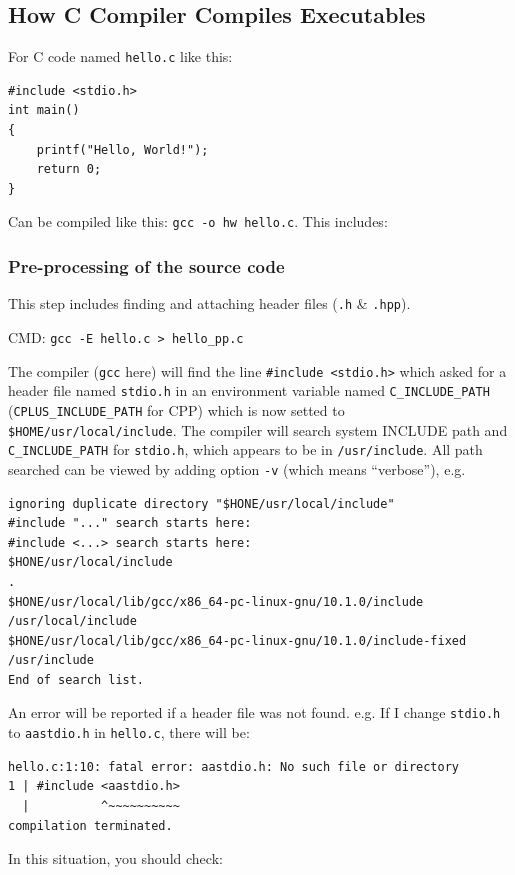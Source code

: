 \documentclass[]{article}
\begin{document}
\subsection{How C Compiler Compiles Executables}
For C code named \verb|hello.c| like this:
\begin{verbatim}
#include <stdio.h>
int main()
{
    printf("Hello, World!");
    return 0;
}
\end{verbatim}

Can be compiled like this: \verb|gcc -o hw hello.c|. This includes:

\subsubsection{Pre-processing of the source code}

This step includes finding and attaching header files (\verb|.h| \& \verb|.hpp|).

CMD: \verb|gcc -E hello.c > hello_pp.c|

The compiler (\verb|gcc| here) will find the line \verb|#include <stdio.h>| which asked for a header file named \verb|stdio.h| in an environment variable named \verb|C_INCLUDE_PATH| (\verb|CPLUS_INCLUDE_PATH| for CPP) which is now setted to \verb|$HOME/usr/local/include|. The compiler will search system INCLUDE path and \verb|C_INCLUDE_PATH| for \verb|stdio.h|, which appears to be in \verb|/usr/include|. All path searched can be viewed by adding option \verb|-v| (which means ``verbose''), e.g.
\begin{verbatim}
ignoring duplicate directory "$HONE/usr/local/include"
#include "..." search starts here:
#include <...> search starts here:
$HONE/usr/local/include
.
$HONE/usr/local/lib/gcc/x86_64-pc-linux-gnu/10.1.0/include
/usr/local/include
$HONE/usr/local/lib/gcc/x86_64-pc-linux-gnu/10.1.0/include-fixed
/usr/include
End of search list.
\end{verbatim}

An error will be reported if a header file was not found. e.g. If I change \verb|stdio.h| to \verb|aastdio.h| in \verb|hello.c|, there will be:

\begin{verbatim}
hello.c:1:10: fatal error: aastdio.h: No such file or directory
1 | #include <aastdio.h>
  |          ^~~~~~~~~~~
compilation terminated.
\end{verbatim}

In this situation, you should check:
\end{document}
